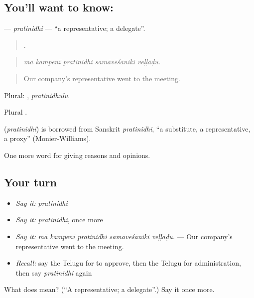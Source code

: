 \subsection*{You'll want to know: }
\textbf{} — \emph{pratinidhi} — \textquotedblleft{}a representative; a delegate\textquotedblright{}.

\begin{quote}
    .
\end{quote}

\begin{quote}
\emph{mā kampenī pratinidhi samāvēśāniki veḷḷāḍu.}
\end{quote}

\begin{quote}
Our company’s representative went to the meeting.
\end{quote}

Plural: , \emph{pratinidhulu}.

Plural .

\begin{cousinweb}
\textbf{} (\emph{pratinidhi}) is borrowed from Sanskrit \emph{pratinidhi}, \textquotedblleft{}a substitute, a representative, a proxy\textquotedblright{} (Monier-Williams).
\end{cousinweb}

\begin{grammarlens}[title={What you've built}]
One more word for giving reasons and opinions.
\end{grammarlens}

\subsection*{Your turn}
\begin{itemize}
\raggedright
  \item \emph{Say it:} \emph{pratinidhi}
  \item \emph{Say it:} \emph{pratinidhi}, once more
  \item \emph{Say it:} \emph{mā kampenī pratinidhi samāvēśāniki veḷḷāḍu.} — Our company’s representative went to the meeting.
  \item \emph{Recall:} say the Telugu for to approve, then the Telugu for administration, then say \emph{pratinidhi} again
\end{itemize}

\begin{tcolorbox}[breakable,colback=teal!4,colframe=teal!35!black,title={Before you move on}]
What does  mean? (\textquotedblleft{}A representative; a delegate\textquotedblright{}.) Say it once more.
\end{tcolorbox}
